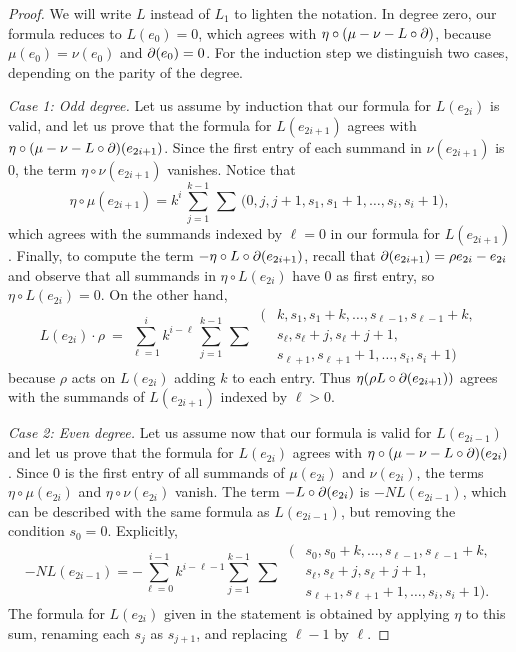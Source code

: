 \begin{proof}
    We will write $L$ instead of $L_1$ to lighten the notation. In degree zero, our formula reduces to $L(e_{0}) = 0$, which agrees with $\eta\circ (\mu - \nu - L\circ \operatorname{\partial})$, because $\mu(e_0) = \nu(e_0)$ and $\operatorname{\partial} (e_0) = 0$. For the induction step we distinguish two cases, depending on the parity of the degree.

    \medskip\noindent\emph{Case 1: Odd degree.} Let us assume by induction that our formula for $L(e_{2i})$ is valid, and let us prove that the formula for $L(e_{2i+1})$ agrees with $\eta\circ (\mu - \nu - L\circ \operatorname{\partial})(e_{2i+1})$. Since the first entry of each summand in $\nu(e_{2i+1})$ is $0$, the term $\eta \circ \nu(e_{2i+1})$ vanishes.
    Notice that
    \[
    \eta \circ \mu(e_{2i+1}) = k^{i} \, \sum_{j=1}^{k-1} \, \sum \, \big(0,j,j+1,s_1,s_1+1,\dots,s_i,s_i+1\big),
    \]
    which agrees with the summands indexed by $\ell=0$ in our formula for $L(e_{2i+1})$.
    Finally, to compute the term $-\eta\circ L\circ \operatorname{\partial}(e_{2i+1})$, recall that $\operatorname{\partial} (e_{2i+1}) = \rho e_{2i} - e_{2i}$ and observe that all summands in $\eta\circ L(e_{2i})$ have $0$ as first entry, so $\eta \circ L(e_{2i}) = 0$.
    On the other hand,
    \[
    L(e_{2i}) \cdot \rho \ = \
    \sum_{\ell = 1}^i k^{i-\ell} \, \sum_{j=1}^{k-1} \, \sum \
    \begin{aligned}
    	\big(&k,s_1,s_1+k,\ldots,s_{\ell-1},s_{\ell-1}+k, \\
    	&s_{\ell},s_{\ell}+j,s_{\ell}+j+1, \\
    	&s_{\ell+1},s_{\ell+1}+1,\ldots,s_i,s_i+1\big)
    \end{aligned}
    \]
    because $\rho$ acts on $L(e_{2i})$ adding $k$ to each entry.
    Thus $\eta(\rho L\circ \operatorname{\partial}(e_{2i+1}))$ agrees with the summands of $L(e_{2i+1})$ indexed by $\ell>0$.

    \medskip\noindent\emph{Case 2: Even degree.}
    Let us assume now that our formula is valid for $L(e_{2i-1})$ and let us prove that the formula for $L(e_{2i})$ agrees with $\eta\circ (\mu - \nu - L\circ \operatorname{\partial})(e_{2i})$.
    Since $0$ is the first entry of all summands of $\mu(e_{2i})$ and $\nu(e_{2i})$, the terms $\eta \circ \mu(e_{2i})$ and $\eta\circ \nu(e_{2i})$ vanish.
    The term $-L\circ \operatorname{\partial}(e_{2i})$ is $-N L(e_{2i-1})$, which can be described with the same formula as $L(e_{2i-1})$, but removing the condition $s_0 = 0$.
    Explicitly,
    \[
   	-N L(e_{2i-1}) = -\sum_{\ell = 0}^{i-1} k^{i-\ell-1} \sum_{j=1}^{k-1} \ \sum \
   	\begin{aligned}
   		\big(&s_0,s_0+k,\ldots,s_{\ell-1},s_{\ell-1}+k, \\
   		&s_{\ell},s_{\ell}+j,s_{\ell}+j+1, \\
   		&s_{\ell+1},s_{\ell+1}+1,\ldots,s_i,s_i+1\big).
   	\end{aligned}
    \]
	The formula for $L(e_{2i})$ given in the statement is obtained by applying $\eta$ to this sum, renaming each $s_j$ as $s_{j+1}$, and replacing $\ell-1$ by $\ell$.
 \end{proof}


